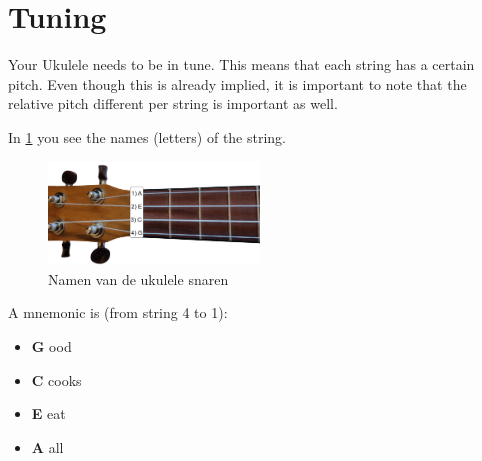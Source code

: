 \section{Tuning}

Your Ukulele needs to be in tune. This means that each string has a certain pitch. Even though this is already implied, it is important to note that the relative pitch different per string is important as well.

In \ref{fig:ukulele_string_names} you see the names (letters) of the string.

\begin{figure}[h]
    \centering
    \includegraphics[width=0.5\textwidth]{../Images/UkuleleNeck-StringNames.png}
    \caption{Namen van de ukulele snaren}
    \label{fig:ukulele_string_names}
\end{figure}

A mnemonic is (from string 4 to 1):

	\begin{itemize}
		\setlength\itemsep{0em}
		\item[4)] \textbf{G} ood
		\item[3)] \textbf{C} cooks
		\item[2)] \textbf{E} eat
		\item[1)] \textbf{A} all 
	\end{itemize}


